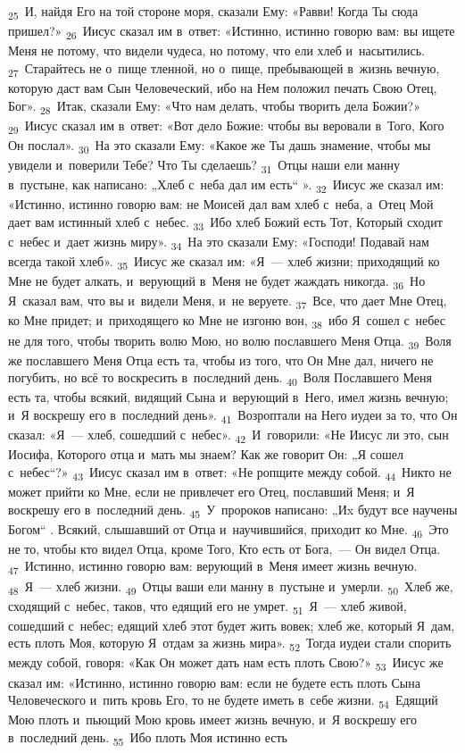 \documentclass[a4paper,12pt]{article}
\begin{document}
\textsubscript{25}~И, найдя Его на той стороне моря, сказали Ему: «Равви! Когда Ты сюда пришел?» \textsubscript{26}~Иисус сказал им в~ответ: «Истинно, истинно говорю вам: вы ищете Меня не потому, что видели чудеса, но потому, что ели хлеб и~насытились. \textsubscript{27}~Старайтесь не о~пище тленной, но о~пище, пребывающей в~жизнь вечную, которую даст вам Сын Человеческий, ибо на Нем положил печать Свою Отец, Бог». \textsubscript{28}~Итак, сказали Ему: «Что нам делать, чтобы творить дела Божии?» \textsubscript{29}~Иисус сказал им в~ответ: «Вот дело Божие: чтобы вы веровали в~Того, Кого Он послал». \textsubscript{30}~На это сказали Ему: «Какое же Ты дашь знамение, чтобы мы увидели и~поверили Тебе? Что Ты сделаешь? \textsubscript{31}~Отцы наши ели манну в~пустыне, как написано: „Хлеб с~неба дал им есть“ ». \textsubscript{32}~Иисус же сказал им: «Истинно, истинно говорю вам: не Моисей дал вам хлеб с~неба, а~Отец Мой дает вам истинный хлеб с~небес. \textsubscript{33}~Ибо хлеб Божий есть Тот, Который сходит с~небес и~дает жизнь миру». \textsubscript{34}~На это сказали Ему: «Господи! Подавай нам всегда такой хлеб». \textsubscript{35}~Иисус же сказал им: «Я~--- хлеб жизни; приходящий ко Мне не будет алкать, и~верующий в~Меня не будет жаждать никогда. \textsubscript{36}~Но Я~сказал вам, что вы и~видели Меня, и~не веруете. \textsubscript{37}~Все, что дает Мне Отец, ко Мне придет; и~приходящего ко Мне не изгоню вон, \textsubscript{38}~ибо Я~сошел с~небес не для того, чтобы творить волю Мою, но волю пославшего Меня Отца. \textsubscript{39}~Воля же пославшего Меня Отца есть та, чтобы из того, что Он Мне дал, ничего не погубить, но всё то воскресить в~последний день. \textsubscript{40}~Воля Пославшего Меня есть та, чтобы всякий, видящий Сына и~верующий в~Него, имел жизнь вечную; и~Я воскрешу его в~последний день». \textsubscript{41}~Возроптали на Него иудеи за то, что Он сказал: «Я~--- хлеб, сошедший с~небес». \textsubscript{42}~И~говорили: «Не Иисус ли это, сын Иосифа, Которого отца и~мать мы знаем? Как же говорит Он: „Я сошел с~небес“?» \textsubscript{43}~Иисус сказал им в~ответ: «Не ропщите между собой. \textsubscript{44}~Никто не может прийти ко Мне, если не привлечет его Отец, пославший Меня; и~Я воскрешу его в~последний день. \textsubscript{45}~У~пророков написано: „Иx будут все научены Богом“ . Всякий, слышавший от Отца и~научившийся, приходит ко Мне. \textsubscript{46}~Это не то, чтобы кто видел Отца, кроме Того, Кто есть от Бога,~--- Он видел Отца. \textsubscript{47}~Истинно, истинно говорю вам: верующий в~Меня имеет жизнь вечную. \textsubscript{48}~Я~— хлеб жизни. \textsubscript{49}~Отцы ваши ели манну в~пустыне и~умерли. \textsubscript{50}~Хлеб же, сходящий с~небес, таков, что едящий его не умрет. \textsubscript{51}~Я~— хлеб живой, сошедший с~небес; едящий хлеб этот будет жить вовек; хлеб же, который Я~дам, есть плоть Моя, которую Я~отдам за жизнь мира». \textsubscript{52}~Тогда иудеи стали спорить между собой, говоря: «Как Он может дать нам есть плоть Свою?» \textsubscript{53}~Иисус же сказал им: «Истинно, истинно говорю вам: если не будете есть плоть Сына Человеческого и~пить кровь Его, то не будете иметь в~себе жизни. \textsubscript{54}~Едящий Мою плоть и~пьющий Мою кровь имеет жизнь вечную, и~Я воскрешу его в~последний день. \textsubscript{55}~Ибо плоть Моя истинно есть 
\end{document}
